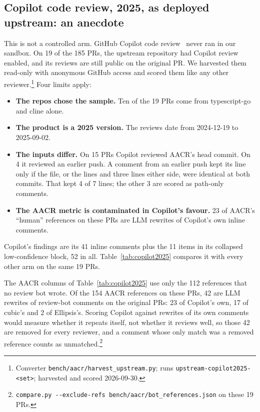 \documentclass[11pt,a4paper]{article}
\newcommand{\code}[1]{\texttt{#1}}
\begin{document}
\subsection{Copilot code review, 2025, as deployed upstream: an anecdote}
\label{sec:copilot2025}

This is not a controlled arm. GitHub Copilot code review~\cite{copilotreview}
never ran in our
sandbox. On 19 of the 185 PRs, the upstream repository had Copilot review
enabled, and its reviews are still public on the original PR. We harvested
them read-only with anonymous GitHub access and scored them like any other
reviewer.\footnote{Converter \code{bench/aacr/harvest\_upstream.py}; runs
\code{upstream-copilot2025-<set>}; harvested and scored
2026-09-30.} Four limits apply:
\begin{itemize}[nosep]
  \item \textbf{The repos chose the sample.} Ten of the 19 PRs come from
    typescript-go and cline alone.
  \item \textbf{The product is a 2025 version.} The reviews date from
    2024-12-19 to 2025-09-02.
  \item \textbf{The inputs differ.} On 15 PRs Copilot reviewed AACR's head
    commit. On 4 it reviewed an earlier push. A comment from an earlier push
    kept its line only if the file, or the lines and three lines either side,
    were identical at both commits. That kept 4 of 7 lines; the other 3 are
    scored as path-only comments.
  \item \textbf{The AACR metric is contaminated in Copilot's favour.} 23 of
    AACR's ``human'' references on these PRs are LLM rewrites of Copilot's
    own inline comments.
\end{itemize}
Copilot's findings are its 41 inline comments plus the 11 items in its
collapsed low-confidence block, 52 in all. Table~\ref{tab:copilot2025}
compares it with every other arm on the same 19 PRs.

The AACR columns of Table~\ref{tab:copilot2025} use only the 112 references
that no review bot wrote. Of the 154 AACR references on these PRs, 42 are LLM
rewrites of review-bot comments on the original PRs: 23 of Copilot's own, 17
of cubic's and 2 of Ellipsis's. Scoring Copilot against rewrites of its own
comments would measure whether it repeats itself, not whether it reviews
well, so those 42 are removed for every reviewer, and a comment whose only
match was a removed reference counts as unmatched.\footnote{\code{compare.py
-{}-exclude-refs bench/aacr/bot\_references.json} on these 19 PRs.}
\end{document}
